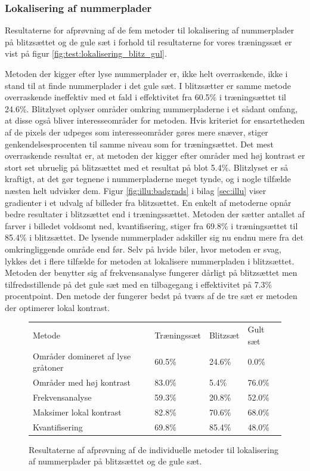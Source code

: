 \subsubsection{Lokalisering af nummerplader}
Resultaterne for afprøvning af de fem metoder til lokalisering af nummerplader på blitzsættet og de gule sæt i forhold til resultaterne for vores træningssæt er vist på figur \vref{fig:test:lokalisering_blitz_gul}.

Metoden der kigger efter lyse nummerplader er, ikke helt overraskende, ikke i stand til at finde nummerplader i det gule sæt. I blitzsætter er samme metode overraskende ineffektiv med et fald i effektivitet fra 60.5\% i træningsættet til 24.6\%. Blitzlyset oplyser områder omkring nummerpladerne i et sådant omfang, at disse også bliver interesseområder for metoden. Hvis kriteriet for ensartetheden af de pixels der udpeges som interesseområder gøres mere snæver, stiger genkendelsesprocenten til samme niveau som for træningsættet. Det mest overraskende resultat er, at metoden der kigger efter områder med høj kontrast er stort set ubruelig på blitzsættet med et resultat på blot 5.4\%. Blitzlyset er så kraftigt, at det gør tegnene i nummerpladerne meget tynde, og i nogle tilfælde næsten helt udvisker dem. Figur \vref{fig:illu:badgrads} i bilag \ref{sec:illu} viser
gradienter i et udvalg af billeder fra blitzsættet. En enkelt af metoderne opnår bedre resultater i blitzsættet end i træningssættet. Metoden der sætter antallet af farver i billedet voldsomt ned, kvantifisering, stiger fra 69.8\% i træningsættet til 85.4\% i blitzsættet. De lysende nummerplader adskiller sig nu endnu mere fra det omkringliggende område end før. Selv på hvide biler, hvor metoden er svag, lykkes det i flere tilfælde for metoden at lokalisere nummerpladen i blitzsættet. Metoden der benytter sig af frekvensanalyse fungerer dårligt på blitzsættet men tilfredsstillende på det gule sæt med en tilbagegang i effektivitet på 7.3\% procentpoint. Den metode der fungerer bedst på tværs af de tre sæt er metoden der optimerer lokal kontrast.

\begin{figure}[htp]
\centering
\begin{tabular}{|l|l|l|l|}
\hline
\rowcolor[gray]{0.9} \multicolumn{4}{|>{\columncolor[gray]{0.9}}c|}{\textbf{Individuelle metoder til lokalisering}} \\ \hline
Metode & Træningssæt & Blitzsæt & Gult sæt\\ \hline
Områder domineret af lyse gråtoner & 60.5\% &  24.6\% & 0.0\%\\ \hline
Områder med høj kontrast & 83.0\% & 5.4\% & 76.0\%\\ \hline
Frekvensanalyse & 59.3\% &  20.8\% & 52.0\%\\ \hline
Maksimer lokal kontrast & 82.8\% &  70.6\% & 68.0\%\\ \hline
Kvantifisering & 69.8\% &  85.4\% & 48.0\%\\
\hline
\end{tabular}
\caption{Resultaterne af afprøvning af de individuelle metoder til lokalisering af nummerplader på blitzsættet og de gule sæt.}
\label{fig:test:lokalisering_blitz_gul}
\end{figure}

